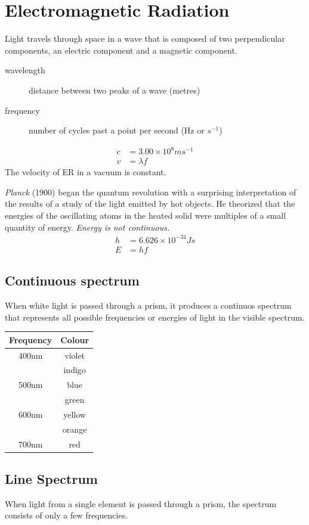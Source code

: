 \documentclass[a4paper, 8pt]{memoir}
\begin{document}
\chapter{Electromagnetic Radiation}
Light travels through space in a wave that is composed of two perpendicular components, an electric component and a magnetic component.
\begin{description}
\item[wavelength] distance between two peaks of a wave (metres)
\item[frequency] number of cycles past a point per second (Hz or $s^{-1}$)
\end{description}
\begin{align}
c &= 3.00 \times 10^{8} ms^{-1} \\
v &= \lambda f
\end{align}
The velocity of ER in a vacuum is constant.

\emph{Planck} (1900) began the quantum revolution with a surprising interpretation of the results of a study of the light emitted by hot objects. He theorized that the energies of the oscillating atoms in the heated solid were multiples of a small quantity of energy. \emph{Energy is not continuous.}
\begin{align}
h &= 6.626 \times 10^{-34} Js \\
E &= hf
\end{align}
\section{Continuous spectrum}
When white light is passed through a prism, it produces a continuos spectrum that represents all possible frequencies or energies of light in the visible spectrum.
\begin{center}
\begin{tabular}{|c|c|}
\hline
Frequency & Colour \\ \hline
400nm & violet \\ \hline
 & indigo \\ \hline
500nm & blue \\ \hline
 & green \\ \hline
600nm & yellow \\ \hline
 & orange \\ \hline
700nm & red \\ \hline
\end{tabular}
\end{center}
\section{Line Spectrum}
When light from a single element is passed through a prism, the spectrum consists of only a few frequencies.
\end{document}
